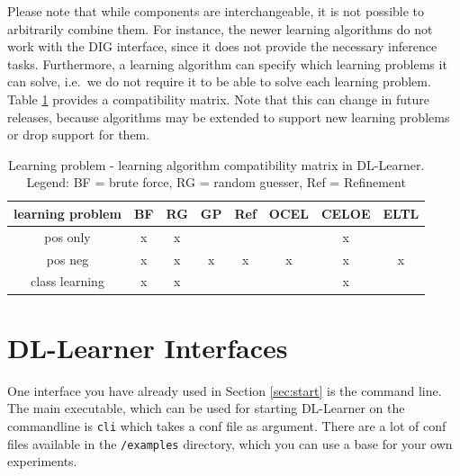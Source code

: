 \documentclass[a4paper,12pt]{scrartcl}
\newcommand{\todo}[1]{\textbf{[ToDo: #1]}}
\begin{document}
Please note that while components are interchangeable, it is not possible to arbitrarily combine them. For instance, the newer learning algorithms do not work with the DIG interface, since it does not provide the necessary inference tasks. Furthermore, a learning algorithm can specify which learning problems it can solve, i.e.~we do not require it to be able to solve each learning problem. Table \ref{tab:la_lp_comp} provides a compatibility matrix. Note that this can change in future releases, because algorithms may be extended to support new learning problems or drop support for them.

\begin{table}[htb]
\centering
\begin{tabular}{c|ccccccc}
learning problem & BF & RG & GP & Ref & OCEL & CELOE & ELTL \\\hline
pos only & x & x & & & & x & \\
pos neg & x & x & x & x & x & x & x  \\
class learning & x & x & & & & x &
\end{tabular}
\caption{Learning problem - learning algorithm compatibility matrix in DL-Learner. Legend: BF = brute force, RG = random guesser, Ref = Refinement}
\label{tab:la_lp_comp}
\end{table}

\section{DL-Learner Interfaces}



One interface you have already used in Section \ref{sec:start} is the command line. The main executable, which can be used for starting DL-Learner on the commandline is \verb|cli| which takes a conf file as argument. There are a lot of conf files available in the \verb|/examples| directory, which you can use a base for your own experiments.

\end{document}
